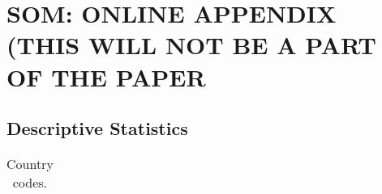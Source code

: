 \documentclass[11pt, letterpaper]{article}
\begin{document}






\section*{SOM: ONLINE APPENDIX (THIS WILL NOT BE A PART OF THE PAPER}

\subsection*{Descriptive Statistics}

\begin{spacing}{.9} \begin{table}[H]\centering  \label{d1} \begin{scriptsize} \begin{tabular}{lllll}\hline
                                                                                        
                                                                                        \hline
                                                                                      \end{tabular}\end{scriptsize}\caption{Country codes.}\end{table} \end{spacing}
        
\end{document}
